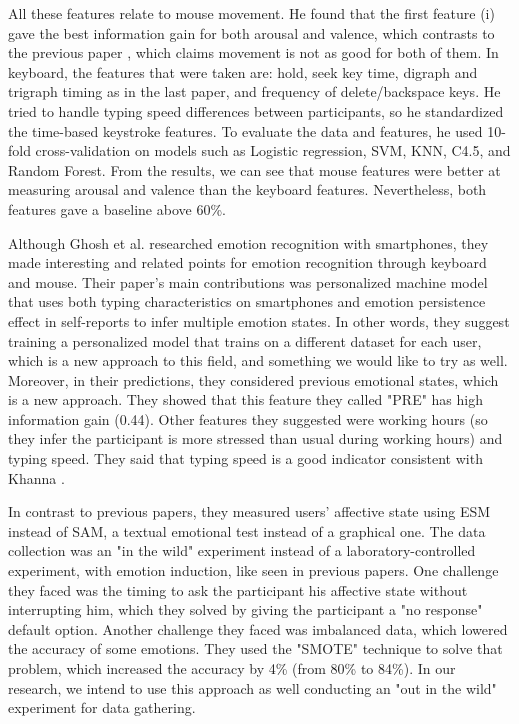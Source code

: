 \documentclass[../main.tex]{subfiles}
\begin{document}
All these features relate to mouse movement. He found that the first feature (i) gave the 
best information gain for both arousal and valence, which contrasts to the previous paper \cite{An_Evaluation_Of_Mouse_And_Keyboard_Interaction}, 
which claims movement is not as good for both of them. 
In keyboard, the features that were taken are: hold, seek key time, digraph and trigraph timing as in 
the last paper, and frequency of delete/backspace keys. He tried to handle typing speed differences 
between participants, so he standardized the time-based keystroke features. 
To evaluate the data and features, he used 10-fold cross-validation on models such as 
Logistic regression, SVM, KNN, C4.5, and Random Forest. 
From the results, we can see that mouse features were better at measuring arousal and valence 
than the keyboard features. Nevertheless, both features gave a baseline above 60\%.
\par

Although Ghosh et al. \cite{Ghosh} researched emotion recognition with smartphones, 
they made interesting and related points for emotion recognition through keyboard and mouse. 
Their paper's main contributions was personalized machine model that uses both typing 
characteristics on smartphones and emotion persistence effect in self-reports to infer 
multiple emotion states. In other words, they suggest training a personalized model that 
trains on a different dataset for each user, which is a new approach to this field, 
and something we would like to try as well. Moreover, in their predictions, they considered previous 
emotional states, which is a new approach. They showed that this feature they called "PRE" has 
high information gain (0.44). Other features they suggested were working hours 
(so they infer the participant is more stressed than usual during working hours) and typing speed. 
They said that typing speed is a good indicator consistent with Khanna \cite{Khanna}.
\par

In contrast to previous papers, they measured users' affective state using ESM instead of SAM, 
a textual emotional test instead of a graphical one. The data collection was an "in the wild" 
experiment instead of a laboratory-controlled experiment, with emotion induction, like seen in 
previous papers. One challenge they faced was the timing to ask the participant his affective 
state without interrupting him, which they solved by giving the participant a "no response" 
default option. Another challenge they faced was imbalanced data, which lowered the accuracy of 
some emotions. They used the "SMOTE" technique to solve that problem, which increased the 
accuracy by 4\% (from 80\% to 84\%).
In our research, we intend to use this approach as well conducting an "out in the wild" experiment for data gathering.

\end{document}
